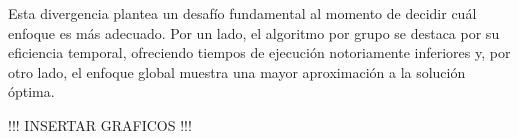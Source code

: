 Esta divergencia plantea un desafío fundamental al momento de decidir cuál enfoque es más adecuado. Por un lado, el algoritmo por grupo se destaca por su eficiencia temporal, ofreciendo tiempos de ejecución notoriamente inferiores y, por otro lado, el enfoque global muestra una mayor aproximación a la solución óptima.

!!! INSERTAR GRAFICOS !!!


